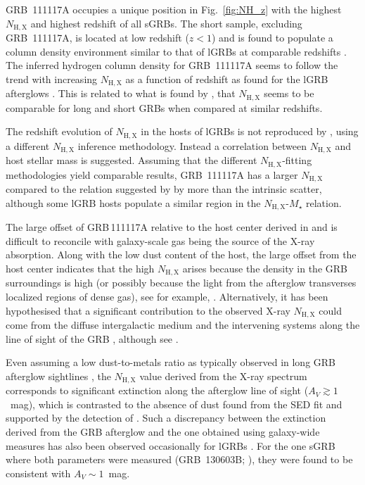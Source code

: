 \documentclass{aa}    %
\begin{document}
GRB~111117A occupies a unique position in Fig.~\ref{fig:NH_z} with the highest
$N_\mathrm{H,X}$ and highest redshift of all sGRBs. The short sample, excluding
GRB~111117A, is located at low redshift ($z < 1$) and is found to populate a
column density environment similar to that of lGRBs at comparable redshifts
\citep{DAvanzo2014a}. The inferred hydrogen column density for GRB~111117A seems
to follow the trend with increasing $N_\mathrm{H,X}$ as a function of redshift as found for
the lGRB afterglows \citep{Campana2010, Starling2013, Arcodia2016}. This is
related to what is found by \citet{Kopac2012, Margutti2013}, that $N_\mathrm{H,X}$ seems to
be comparable for long and short GRBs when compared at similar redshifts.

The redshift evolution of $N_\mathrm{H,X}$ in the hosts of lGRBs is not
reproduced by \citet{Buchner2017}, using a different $N_\mathrm{H,X}$ inference
methodology. Instead a correlation between $N_\mathrm{H,X}$ and host stellar
mass is suggested. Assuming that the different $N_\mathrm{H,X}$-fitting
methodologies yield comparable results, GRB~111117A has a larger
$N_\mathrm{H,X}$ compared to the relation suggested by \citet{Buchner2017} by
more than the intrinsic scatter, although some lGRB hosts populate a similar
region in the $N_\mathrm{H,X}$-$M_\star$ relation.

The large offset of GRB\,111117A relative to the host center derived in
\citet{Margutti2012} and \citet{Sakamoto2013} is difficult to reconcile with
galaxy-scale gas being the source of the X-ray absorption. Along with the low
dust content of the host, the large offset from the host center indicates that
the high $N_\mathrm{H,X}$ arises because the density in the GRB surroundings is
high (or possibly because the light from the afterglow transverses localized
regions of dense gas), see for example,
\citep[e.g.][]{Watson2013, Krongold2013}. Alternatively, it has been
hypothesised that a significant contribution to the observed X-ray
$N_\mathrm{H,X}$ could come from the diffuse intergalactic medium and the
intervening systems along the line of sight of the GRB \citep{Campana2012,
	Arcodia2016}, although see \citep{Watson2013, Krongold2013}.

Even assuming a low dust-to-metals ratio as typically observed in long GRB
afterglow sightlines \citep{Galama2001, Schady2010, Covino2013}, the
$N_\mathrm{H,X}$ value derived from the X-ray spectrum corresponds to
significant extinction along the afterglow line of sight ($A_V \gtrsim 1$~mag),
which is contrasted to the absence of dust found from the SED fit and supported
by the detection of \lya{}. Such a discrepancy between the extinction derived
from the GRB afterglow and the one obtained using galaxy-wide measures has also
been observed occasionally for lGRBs \citep{Perley2013a}. For the one sGRB where
both parameters were measured (GRB~130603B; \citealt{DeUgartePostigo2014b}),
they were found to be consistent with $A_V \sim 1$~mag.
\end{document}
